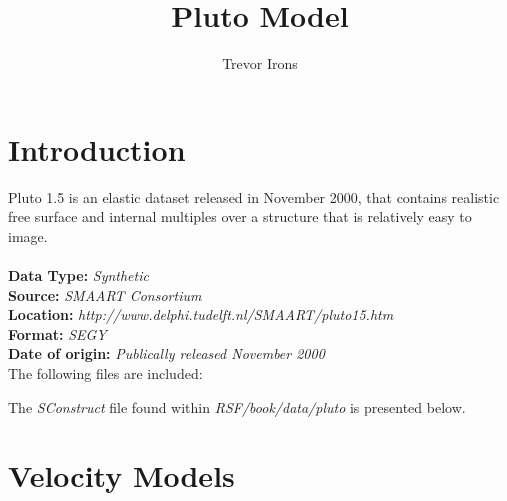 \title{Pluto Model}
\author{Trevor Irons}

\maketitle
\lstset{language=python,numbers=left,numberstyle=\tiny,showstringspaces=false}

\section{Introduction} 
Pluto 1.5 is an elastic dataset released in November 2000, that contains realistic free surface and internal multiples over a structure that is relatively easy to image. 
\\
\\
\textbf {
        Data Type:} \emph{Synthetic}\\
\textbf {
        Source:} \emph{SMAART Consortium}\\
\textbf {
        Location:} \emph{http://www.delphi.tudelft.nl/SMAART/pluto15.htm}\\
\textbf {
        Format:} \emph{SEGY} \\
\textbf{
        Date of origin:} \emph{Publically released November 2000}\\


\noindent The following files are included:
\tiny

\normalsize

\noindent The \emph{SConstruct} file found within \emph{RSF/book/data/pluto} is presented below.
\tiny

\normalsize


\section{Velocity Models}
